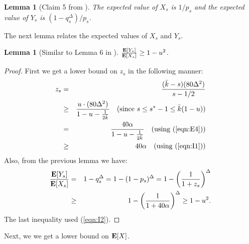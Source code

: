\documentclass[11pt]{article}
\newtheorem{lemma}[theorem]{Lemma}
\newcommand{\ex}{{\bf E}}
\begin{document}
\begin{lemma}[Claim 5 from \cite{br12}]
The expected value of $X_s$ is $1/p_s$ and the expected value of $Y_s$ is $(1-q_s^{\Delta})/p_s$.
\end{lemma}


The next lemma relates the expected values of $X_s$ and $Y_s$.

\begin{lemma}[Similar to Lemma 6 in \cite{br12}]
$\frac{\ex[Y_s]}{\ex[X_s]} \geq 1 - u^2$.
\end{lemma}
\begin{proof}
First we get a lower bound on $z_s$ in the following manner:
\begin{eqnarray*}
z_s &=& \frac{(\bar{k}-s) (80 \Delta^2)}{s - 1/2} \\
&\geq&  \frac{u \cdot (80 \Delta^2)}{1 - u - \frac{1}{2\bar{k}}} \quad \textrm{(since $s \leq s^*-1 \leq \bar{k}(1-u)$)} \\
&=& \frac{40 \alpha}{1 - u - \frac{1}{2\bar{k}}} \quad \textrm{(using (\ref{eqn:E4}))} \\
&\geq& 40 \alpha \quad \textrm{(using (\ref{eqn:I1}))}
\end{eqnarray*}
Also, from the previous lemma we have:
\begin{eqnarray*}
\frac{\ex[Y_s]}{\ex[X_s]} &=& 1 - q_s^{\Delta}= 1 - (1 - p_s)^{\Delta} = 1 - \left( \frac{1}{1 + z_s} \right)^{\Delta}\\
			  &\geq& 1 - \left( \frac{1}{1 + 40 \alpha} \right)^{\Delta} \geq 1 - u^2.
\end{eqnarray*}
The last inequality used (\ref{eqn:I2}).
\end{proof}

Next, we we get a lower bound on $\ex[X]$.
\end{document}
